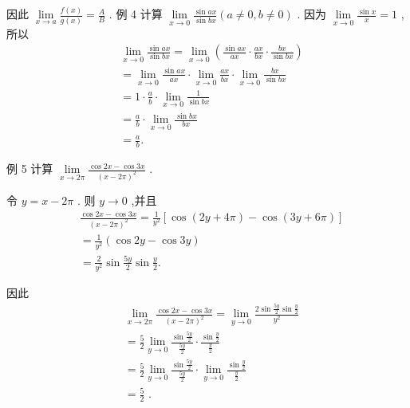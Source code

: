 因此 $\mathop{\lim }\limits_{{x \rightarrow  a}}\frac{f\left( x\right) }{g\left( x\right) } = \frac{A}{B}$ . 例 4 计算 $\mathop{\lim }\limits_{{x \rightarrow  0}}\frac{\sin {ax}}{\sin {bx}}\left( {a \neq  0,b \neq  0}\right)$ . 因为 $\mathop{\lim }\limits_{{x \rightarrow  0}}\frac{\sin x}{x} = 1$ ,所以
\begin{align*}
	&\mathop{\lim }\limits_{{x \rightarrow  0}}\frac{\sin {ax}}{\sin {bx}} = \mathop{\lim }\limits_{{x \rightarrow  0}}\left( {\frac{\sin {ax}}{ax} \cdot  \frac{ax}{bx} \cdot  \frac{bx}{\sin {bx}}}\right)\\
	&= \mathop{\lim }\limits_{{x \rightarrow  0}}\frac{\sin {ax}}{ax} \cdot  \mathop{\lim }\limits_{{x \rightarrow  0}}\frac{ax}{bx} \cdot  \mathop{\lim }\limits_{{x \rightarrow  0}}\frac{bx}{\sin {bx}}\\
	&= 1 \cdot  \frac{a}{b} \cdot  \mathop{\lim }\limits_{{x \rightarrow  0}}\frac{1}{\sin {bx}}\\
	&= \frac{a}{b} \cdot  \mathop{\lim }\limits_{{x \rightarrow  0}}\frac{\sin {bx}}{bx}\\
	&= \frac{a}{b}.
\end{align*}

例 5 计算 $\mathop{\lim }\limits_{{x \rightarrow  {2\pi }}}\frac{\cos {2x} - \cos {3x}}{{\left( x - 2\pi \right) }^{2}}$ .

令 $y = x - {2\pi }$ . 则 $y \rightarrow  0$ ,并且
\begin{align*}
	&\frac{\cos {2x} - \cos {3x}}{{\left( x - 2\pi \right) }^{2}} = \frac{1}{{y}^{2}}\left\lbrack  {\cos \left( {{2y} + {4\pi }}\right)  - \cos \left( {{3y} + {6\pi }}\right) }\right\rbrack\\
	&= \frac{1}{{y}^{2}}\left( {\cos {2y} - \cos {3y}}\right)\\
	&= \frac{2}{{y}^{2}}\sin \frac{5y}{2}\sin \frac{y}{2}.
\end{align*}

因此
\begin{align*}
	&\mathop{\lim }\limits_{{x \rightarrow  {2\pi }}}\frac{\cos {2x} - \cos {3x}}{{\left( x - 2\pi \right) }^{2}} = \mathop{\lim }\limits_{{y \rightarrow  0}}\frac{2\sin \frac{5y}{2}\sin \frac{y}{2}}{{y}^{2}}\\
	&= \frac{5}{2}\mathop{\lim }\limits_{{y \rightarrow  0}}\frac{\sin \frac{5y}{2}}{\frac{5y}{2}} \cdot  \frac{\sin \frac{y}{2}}{\frac{y}{2}}\\
	&= \frac{5}{2}\mathop{\lim }\limits_{{y \rightarrow  0}}\frac{\sin \frac{5y}{2}}{\frac{5y}{2}} \cdot  \mathop{\lim }\limits_{{y \rightarrow  0}}\frac{\sin \frac{y}{2}}{\frac{y}{2}}\\
	&= \frac{5}{2}\text{ . }
\end{align*}

